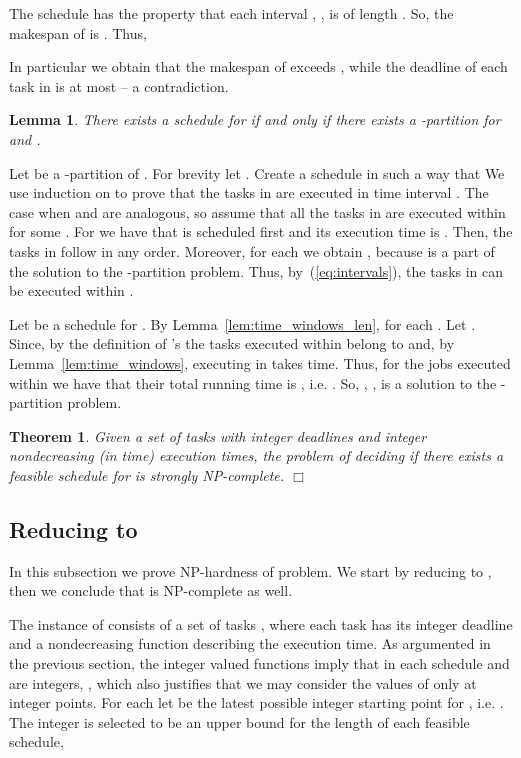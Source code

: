 \documentclass[10pt]{article}
\newenvironment{proof}[1][Proof]
{\par\noindent{\bf #1:} }{\hspace*{\fill}\nolinebreak{}\bigskip\par}
\newcommand{\qed}{\hspace*{\fill}\nolinebreak\ensuremath{\Box}}
\newtheorem{theorem}{Theorem}
\newtheorem{lemma}{Lemma}
\begin{document}
\begin{proof}
The schedule  has the property that each interval , , is of length . So, the makespan of  is . Thus,

In particular we obtain that the makespan of  exceeds , while the deadline of each task in  is at most  -- a contradiction.
\end{proof}


\begin{lemma} \label{lem:reduction}
There exists a schedule for  if and only if there exists a -partition for  and .
\end{lemma}
\begin{proof}
Let  be a -partition of . For brevity let . Create a schedule  in such a way that 
We use induction on  to prove that the tasks in  are executed in time interval . The case when  and  are analogous, so assume that all the tasks in  are executed within  for some . For  we have that  is scheduled first and its execution time is . Then, the tasks in  follow in any order. Moreover, for each  we obtain , because  is a part of the solution to the -partition problem. Thus, by~(\ref{eq:intervals}), the tasks in  can be executed within .

Let  be a schedule for . By Lemma~\ref{lem:time_windows_len},  for each . Let . Since, by the definition of 's the tasks executed within  belong to  and, by Lemma~\ref{lem:time_windows}, executing  in  takes  time. Thus, for the jobs  executed within  we have that their total running time is , i.e. . So, , , is a solution to the -partition problem.
\end{proof}

\begin{theorem} \label{thm:tds_hard}
Given a set of tasks  with integer deadlines and integer nondecreasing (in time) execution times, the problem of deciding if there exists a feasible schedule for  is strongly \textup{NP}-complete.
\qed
\end{theorem}





\subsection{Reducing  to }
\label{subsec:reduction}

In this subsection we prove NP-hardness of  problem. We start by reducing  to , then we conclude that  is NP-complete as well.

The instance of  consists of a set of tasks , where each task  has its integer deadline  and a nondecreasing function  describing the execution time. As argumented in the previous section, the integer valued functions  imply that in each schedule  and  are integers, , which also justifies that we may consider the values of  only at integer points. For each  let  be the latest possible integer starting point for , i.e. . The integer  is selected to be an upper bound for the length of each feasible schedule,
\end{document}

